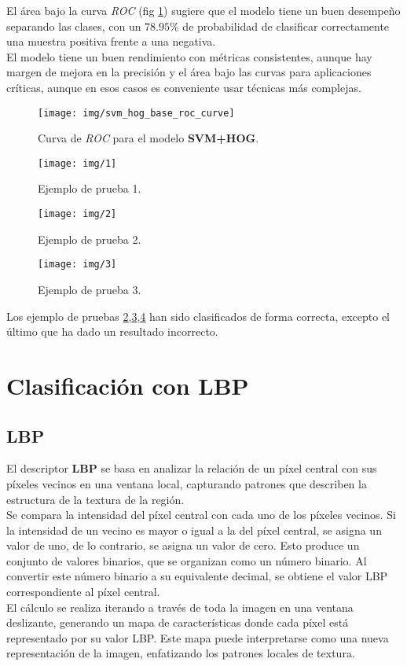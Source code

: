 \documentclass[12pt,letterpaper]{article}
\begin{document}
El área bajo la curva \textit{ROC} (fig \ref{fig:roc_hog}) sugiere que el modelo tiene un buen desempeño separando las clases, con un $78.95\%$ de probabilidad de clasificar correctamente una muestra positiva frente a una negativa.\\[6pt]
El modelo tiene un buen rendimiento con métricas consistentes, aunque hay margen de mejora en la precisión y el área bajo las curvas para aplicaciones críticas, aunque en esos casos es conveniente usar técnicas más complejas.

\begin{figure}[htp]
    \centering
    \texttt{[image: img/svm\_hog\_base\_roc\_curve]}
    \caption{Curva de \textit{ROC} para el modelo \textbf{SVM+HOG}.}
    \label{fig:roc_hog}
\end{figure}

\begin{figure}[htp]
    \centering
    \texttt{[image: img/1]}
    \caption{Ejemplo de prueba 1.}
    \label{fig:1}
\end{figure}

\begin{figure}[htp]
    \centering
    \texttt{[image: img/2]}
    \caption{Ejemplo de prueba 2.}
    \label{fig:2}
\end{figure}

\begin{figure}[htp]
    \centering
    \texttt{[image: img/3]}
    \caption{Ejemplo de prueba 3.}
    \label{fig:3}
\end{figure}

Los ejemplo de pruebas \ref{fig:1},\ref{fig:2},\ref{fig:3} han sido clasificados de forma correcta, excepto el último que ha dado un resultado incorrecto.

\section{Clasificación con LBP}
\subsection{LBP}
El descriptor \textbf{LBP} se basa en analizar la relación de un píxel central con sus píxeles vecinos en una ventana local, capturando patrones que describen la estructura de la textura de la región.\\[6pt]
Se compara la intensidad del píxel central con cada uno de los píxeles vecinos. Si la intensidad de un vecino es mayor o igual a la del píxel central, se asigna un valor de uno, de lo contrario, se asigna un valor de cero. Esto produce un conjunto de valores binarios, que se organizan como un número binario. Al convertir este número binario a su equivalente decimal, se obtiene el valor LBP correspondiente al píxel central.\\[6pt]
El cálculo se realiza iterando a través de toda la imagen en una ventana deslizante, generando un mapa de características donde cada píxel está representado por su valor LBP. Este mapa puede interpretarse como una nueva representación de la imagen, enfatizando los patrones locales de textura.
\end{document}
